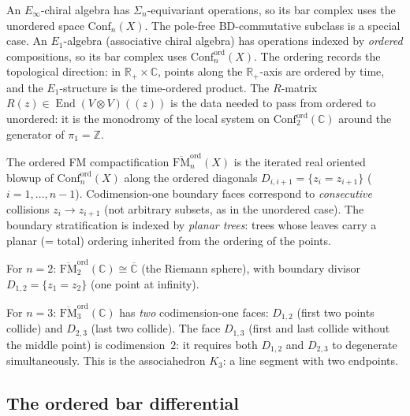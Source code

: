 \begin{remark}
An $E_\infty$-chiral algebra has
$\Sigma_n$-equivariant operations, so its bar complex
uses the unordered space $\mathrm{Conf}_n(X)$.
The pole-free BD-commutative subclass is a special case.
An $E_1$-algebra (associative chiral algebra) has
operations indexed by \emph{ordered} compositions, so its
bar complex uses $\mathrm{Conf}_n^{\mathrm{ord}}(X)$.
The ordering records the topological direction: in
$\mathbb R_+\times\mathbb C$, points along the
$\mathbb R_+$-axis are ordered by time, and the
$E_1$-structure is the time-ordered product. The
$R$-matrix $R(z)\in\operatorname{End}(V\otimes V)(\!(z)\!)$
is the data needed to pass from ordered to unordered:
it is the monodromy of the local system on
$\mathrm{Conf}_2^{\mathrm{ord}}(\mathbb C)$ around the
generator of $\pi_1=\mathbb Z$.
\end{remark}

\begin{construction}
The ordered FM compactification
$\overline{\mathrm{FM}}_n^{\mathrm{ord}}(X)$ is the
iterated real oriented blowup of
$\mathrm{Conf}_n^{\mathrm{ord}}(X)$ along the ordered
diagonals $D_{i,i+1}=\{z_i=z_{i+1}\}$ ($i=1,\dots,n-1$).
Codimension-one boundary faces correspond to
\emph{consecutive} collisions $z_i\to z_{i+1}$
(not arbitrary subsets, as in the unordered case).
The boundary stratification is indexed by
\emph{planar trees}: trees whose leaves carry a planar
(= total) ordering inherited from the ordering of the
points.

For $n=2$:
$\overline{\mathrm{FM}}_2^{\mathrm{ord}}(\mathbb C)
\cong\overline{\mathbb C}$ (the Riemann sphere), with
boundary divisor $D_{1,2}=\{z_1=z_2\}$ (one point at
infinity).

For $n=3$:
$\overline{\mathrm{FM}}_3^{\mathrm{ord}}(\mathbb C)$
has \emph{two} codimension-one faces: $D_{1,2}$ (first two
points collide) and $D_{2,3}$ (last two collide). The
face $D_{1,3}$ (first and last collide without the middle
point) is codimension~$2$: it requires both $D_{1,2}$
and $D_{2,3}$ to degenerate simultaneously. This is the
associahedron $K_3$: a line segment with two endpoints.
\end{construction}

\subsection{The ordered bar differential}

